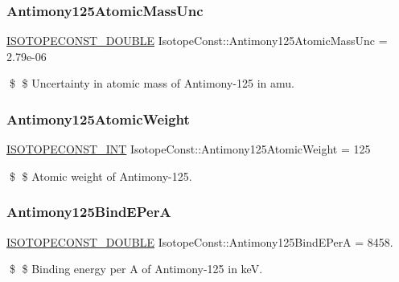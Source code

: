 \subsubsection{\texorpdfstring{Antimony125\+Atomic\+Mass\+Unc}{Antimony125AtomicMassUnc}}
{\footnotesize\ttfamily \mbox{\hyperlink{group___isotope_const-_macros_ga8f45a7272ce02c0b4c65c44636ed719a}{I\+S\+O\+T\+O\+P\+E\+C\+O\+N\+S\+T\+\_\+\+D\+O\+U\+B\+LE}} Isotope\+Const\+::\+Antimony125\+Atomic\+Mass\+Unc = 2.\+79e-\/06}

\$ \$ Uncertainty in atomic mass of Antimony-\/125 in amu. \mbox{\label{group___isotope_const-_antimony-_sb125_ga659078bbe7a7b938b039823c36d02f7c}} 
\subsubsection{\texorpdfstring{Antimony125\+Atomic\+Weight}{Antimony125AtomicWeight}}
{\footnotesize\ttfamily \mbox{\hyperlink{group___isotope_const-_macros_ga5f18360b3e99483a35c32d789e62621c}{I\+S\+O\+T\+O\+P\+E\+C\+O\+N\+S\+T\+\_\+\+I\+NT}} Isotope\+Const\+::\+Antimony125\+Atomic\+Weight = 125}

\$ \$ Atomic weight of Antimony-\/125. \mbox{\label{group___isotope_const-_antimony-_sb125_gae2e23998a8729a1c986a17b5f6f9a797}} 
\subsubsection{\texorpdfstring{Antimony125\+Bind\+E\+PerA}{Antimony125BindEPerA}}
{\footnotesize\ttfamily \mbox{\hyperlink{group___isotope_const-_macros_ga8f45a7272ce02c0b4c65c44636ed719a}{I\+S\+O\+T\+O\+P\+E\+C\+O\+N\+S\+T\+\_\+\+D\+O\+U\+B\+LE}} Isotope\+Const\+::\+Antimony125\+Bind\+E\+PerA = 8458.}

\$ \$ Binding energy per A of Antimony-\/125 in keV. \mbox{\label{group___isotope_const-_antimony-_sb125_ga07e84f550b2d5889b796bee3d63a22c5}} 
